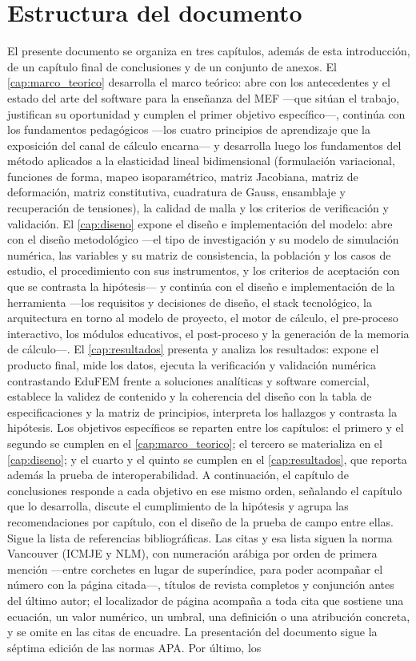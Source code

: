 \section*{Estructura del documento}

El presente documento se organiza en tres capítulos, además de esta introducción, de un capítulo final de conclusiones y de un conjunto de anexos. El \autoref{cap:marco_teorico} desarrolla el marco teórico: abre con los antecedentes y el estado del arte del software para la enseñanza del MEF —que sitúan el trabajo, justifican su oportunidad y cumplen el primer objetivo específico—, continúa con los fundamentos pedagógicos —los cuatro principios de aprendizaje que la exposición del canal de cálculo encarna— y desarrolla luego los fundamentos del método aplicados a la elasticidad lineal bidimensional (formulación variacional, funciones de forma, mapeo isoparamétrico, matriz Jacobiana, matriz de deformación, matriz constitutiva, cuadratura de Gauss, ensamblaje y recuperación de tensiones), la calidad de malla y los criterios de verificación y validación. El \autoref{cap:diseno} expone el diseño e implementación del modelo: abre con el diseño metodológico —el tipo de investigación y su modelo de simulación numérica, las variables y su matriz de consistencia, la población y los casos de estudio, el procedimiento con sus instrumentos, y los criterios de aceptación con que se contrasta la hipótesis— y continúa con el diseño e implementación de la herramienta —los requisitos y decisiones de diseño, el stack tecnológico, la arquitectura en torno al modelo de proyecto, el motor de cálculo, el pre-proceso interactivo, los módulos educativos, el post-proceso y la generación de la memoria de cálculo—. El \autoref{cap:resultados} presenta y analiza los resultados: expone el producto final, mide los datos, ejecuta la verificación y validación numérica contrastando EduFEM frente a soluciones analíticas y software comercial, establece la validez de contenido y la coherencia del diseño con la tabla de especificaciones y la matriz de principios, interpreta los hallazgos y contrasta la hipótesis. Los objetivos específicos se reparten entre los capítulos: el primero y el segundo se cumplen en el \autoref{cap:marco_teorico}; el tercero se materializa en el \autoref{cap:diseno}; y el cuarto y el quinto se cumplen en el \autoref{cap:resultados}, que reporta además la prueba de interoperabilidad. A continuación, el capítulo de conclusiones responde a cada objetivo en ese mismo orden, señalando el capítulo que lo desarrolla, discute el cumplimiento de la hipótesis y agrupa las recomendaciones por capítulo, con el diseño de la prueba de campo entre ellas. Sigue la lista de referencias bibliográficas. Las citas y esa lista siguen la norma Vancouver (ICMJE y NLM), con numeración arábiga por orden de primera mención —entre corchetes en lugar de superíndice, para poder acompañar el número con la página citada—, títulos de revista completos y conjunción antes del último autor; el localizador de página acompaña a toda cita que sostiene una ecuación, un valor numérico, un umbral, una definición o una atribución concreta, y se omite en las citas de encuadre. La presentación del documento sigue la séptima edición de las normas APA. Por último, los 